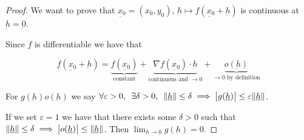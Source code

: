 \documentclass[10pt]{extarticle}
\newcommand{\munderbar}[1]{\underbar{\ensuremath{#1}}}
\begin{document}
\begin{proof}
    We want to prove that $\munderbar{x_0} = (x_0, y_0)$, $\munderbar{h} \mapsto f(\munderbar{x_0} + \munderbar{h})$ is continuous at $\munderbar{h} = \munderbar{0}$.

    Since $f$ is differentiable we have that

    $$
        f(\munderbar{x_0} + \munderbar{h}) =
        \underbrace{f(\munderbar{x_0})}_{\text{constant}}
        + \underbrace{\nabla f(\munderbar{x_0}) \cdot \munderbar{h}}_{\text{continuous and } \to 0}
        + \underbrace{o(\munderbar{h})}_{\to 0 \text{ by definition}}
    $$

    For $g(\munderbar{h}) o(\munderbar{h})$ we say $\forall \varepsilon > 0, \enspace \exists \delta > 0, \enspace \norm{\munderbar{h}} \leq \delta \implies \abs{g(\munderbar{h})} \leq \varepsilon \norm{\munderbar{h}}$.

    If we set $\varepsilon = 1$ we have that there exists some $\delta > 0$ such that
    $\norm{\munderbar{h}} \leq \delta \implies \abs{o(\munderbar{h})} \leq \norm{\munderbar{h}}$.
    Then $\lim_{\munderbar{h} \to \munderbar{0}} g(\munderbar{h}) = 0$.

\end{proof}
\end{document}
